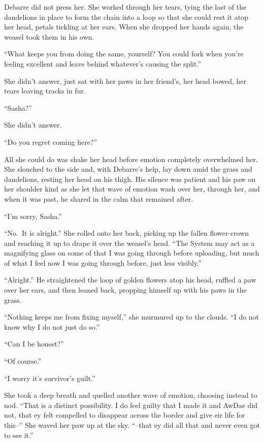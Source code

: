 Debarre did not press her. She worked through her tears, tying the last of the dandelions in place to form the chain into a loop so that she could rest it atop her head, petals tickling at her ears. When she dropped her hands again, the weasel took them in his own.

``What keeps you from doing the same, yourself? You could fork when you're feeling excellent and leave behind whatever's causing the split.''

She didn't answer, just sat with her paws in her friend's, her head bowed, her tears leaving tracks in fur.

``Sasha?''

She didn't answer.

``Do you regret coming here?''

All she could do was shake her head before emotion completely overwhelmed her. She slouched to the side and, with Debarre's help, lay down amid the grass and dandelions, resting her head on his thigh. His silence was patient and his paw on her shoulder kind as she let that wave of emotion wash over her, through her, and when it was past, he shared in the calm that remained after.

``I'm sorry, Sasha.''

``No.~It is alright.'' She rolled onto her back, picking up the fallen flower-crown and reaching it up to drape it over the weasel's head. ``The System may act as a magnifying glass on some of that I was going through before uploading, but much of what I feel now I was going through before, just less visibly.''

``Alright.'' He straightened the loop of golden flowers atop his head, ruffled a paw over her ears, and then leaned back, propping himself up with his paws in the grass.

``Nothing keeps me from fixing myself,'' she murmured up to the clouds. ``I do not know why I do not just do so.''

``Can I be honest?''

``Of course.''

``I worry it's survivor's guilt.''

She took a deep breath and quelled another wave of emotion, choosing instead to nod. ``That is a distinct possibility. I do feel guilty that I made it and AwDae did not, that ey felt compelled to disappear across the border and give eir life for this--'' She waved her paw up at the sky. ``--that ey did all that and never even got to see it.''

